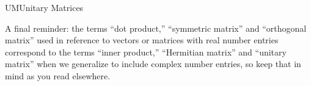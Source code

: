 \begin{subsect}{UM}{Unitary Matrices}
%
%
\begin{para}A final reminder:  the terms ``dot product,'' ``symmetric matrix'' and ``orthogonal matrix'' used in reference to vectors or matrices with real number entries correspond to the terms ``inner product,'' ``Hermitian matrix'' and ``unitary matrix'' when we generalize to include complex number entries, so keep that in mind as you read elsewhere.\end{para}
%
\end{subsect}
%








